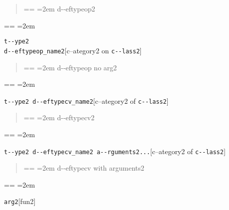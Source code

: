 \documentclass{book}
\makeatletter
\newenvironment{GNUTexinfopreformatted}{%
  \par\obeylines\obeyspaces\frenchspacing
  \parskip=\z@\parindent=\z@}{}
\makeatother
\begin{document}
%
\begin{quote}
\unskip{\parskip=0pt\noindent}%
\begin{GNUTexinfopreformatted}
\leftskip=2em\relax\ttfamily%
d{-}{-}eftypeop2
\end{GNUTexinfopreformatted}
\end{quote}
\begin{GNUTexinfopreformatted}
\leftskip=2em\relax\ttfamily%

\end{GNUTexinfopreformatted}
\noindent\texttt{t{-}{-}ype2\leavevmode{}\\d{-}{-}eftypeop\_name2}\hfill[c--ategory2 on \texttt{c{-}{-}lass2}]



%
\begin{quote}
\unskip{\parskip=0pt\noindent}%
\begin{GNUTexinfopreformatted}
\leftskip=2em\relax\ttfamily%
d{-}{-}eftypeop no arg2
\end{GNUTexinfopreformatted}
\end{quote}
\begin{GNUTexinfopreformatted}
\leftskip=2em\relax\ttfamily%

\end{GNUTexinfopreformatted}
\noindent\texttt{t{-}{-}ype2 d{-}{-}eftypecv\_name2}\hfill[c--ategory2 of \texttt{c{-}{-}lass2}]



%
\begin{quote}
\unskip{\parskip=0pt\noindent}%
\begin{GNUTexinfopreformatted}
\leftskip=2em\relax\ttfamily%
d{-}{-}eftypecv2
\end{GNUTexinfopreformatted}
\end{quote}
\begin{GNUTexinfopreformatted}
\leftskip=2em\relax\ttfamily%

\end{GNUTexinfopreformatted}
\noindent\texttt{t{-}{-}ype2 d{-}{-}eftypecv\_name2 a{-}{-}rguments2...}\hfill[c--ategory2 of \texttt{c{-}{-}lass2}]



%
\begin{quote}
\unskip{\parskip=0pt\noindent}%
\begin{GNUTexinfopreformatted}
\leftskip=2em\relax\ttfamily%
d{-}{-}eftypecv with arguments2
\end{GNUTexinfopreformatted}
\end{quote}
\begin{GNUTexinfopreformatted}
\leftskip=2em\relax\ttfamily%

\end{GNUTexinfopreformatted}
\noindent\texttt{arg2}\hfill[fun2]
\end{document}
